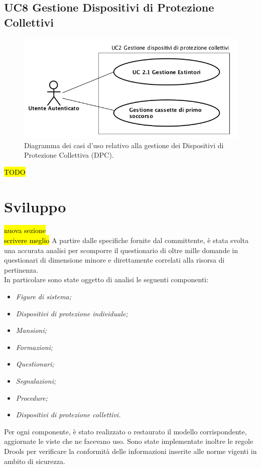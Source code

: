 	\subsection{UC8 Gestione Dispositivi di Protezione Collettivi}
		\label{section:UC8}
		\begin{figure}[H]
			\begin{center}
				\includegraphics[width=12cm]{Pics/UC8GestioneDispositiviProtezioneCollettivi.png}
				\caption{Diagramma dei casi d'uso relativo alla gestione dei Dispositivi di Protezione Collettiva (DPC).}
				\label{fig:UC2_DPC}
			\end{center}
		\end{figure}
		\hl{TODO}

\section{Sviluppo}
\hl{nuova sezione} \\
\hl{scrivere meglio}
A partire dalle specifiche fornite dal committente, è stata svolta una accurata analisi per scomporre il questionario di oltre mille domande in questionari di dimensione minore e direttamente correlati alla risorsa di pertinenza.\\
In particolare sono state oggetto di analisi le seguenti componenti:
\begin{itemize}
	\item \textit{Figure di sistema;}
	\item \textit{Dispositivi di protezione individuale;}
	\item \textit{Mansioni;}
	\item \textit{Formazioni;}
	\item \textit{Questionari;}
	\item \textit{Segnalazioni;}
	\item \textit{Procedure;}
	\item \textit{Dispositivi di protezione collettivi.}
\end{itemize}
Per ogni componente, è stato realizzato o restaurato il modello corrispondente, aggiornate le viste che ne facevano uso. Sono state implementate inoltre le regole Drools per verificare la conformità delle informazioni inserite alle norme vigenti in ambito di sicurezza.
